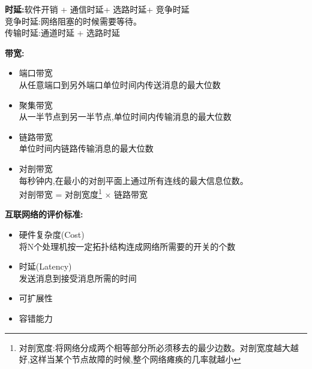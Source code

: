 \documentclass[UTF8,a4paper]{ctexart}
\newcommand{\spaceline}{\vspace{\baselineskip}}
\begin{document}
  \spaceline
  \textbf{时延:}软件开销 + 通信时延+ 选路时延+ 竞争时延\\
  竞争时延:网络阻塞的时候需要等待。\\
  传输时延:通道时延 + 选路时延

  \spaceline
  \textbf{带宽:}
  \begin{itemize}
    \item 端口带宽\\
    从任意端口到另外端口单位时间内传送消息的最大位数
    \item 聚集带宽\\
    从一半节点到另一半节点,单位时间内传输消息的最大位数
    \item 链路带宽\\
    单位时间内链路传输消息的最大位数
    \item 对剖带宽\\
    每秒钟内,在最小的对剖平面上通过所有连线的最大信息位数。\\
    对剖带宽 = 对剖宽度\footnote{对剖宽度:将网络分成两个相等部分所必须移去的最少边数。对剖宽度越大越好,这样当某个节点故障的时候,整个网络瘫痪的几率就越小} $\times$ 链路带宽
  \end{itemize}

  \spaceline
  \textbf{互联网络的评价标准:}
  \begin{itemize}
    \item 硬件复杂度(Cost)\\
    将N个处理机按一定拓扑结构连成网络所需要的开关的个数
    \item 时延(Latency)\\
    发送消息到接受消息所需的时间
    \item 可扩展性
    \item 容错能力
  \end{itemize}
\end{document}
